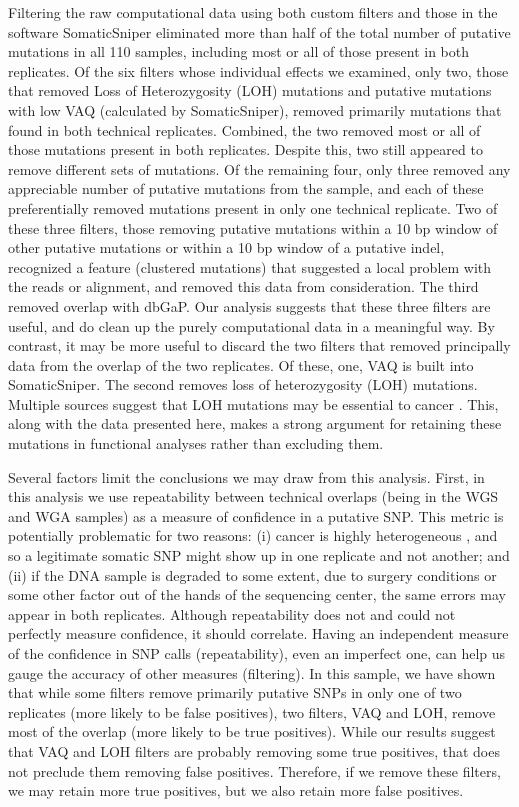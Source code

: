 \documentclass[11pt]{article} %
\begin{document}
Filtering the raw computational data using both custom filters and those in the software SomaticSniper eliminated more than half of the total number of putative mutations in all 110 samples, including most or all of those present in both replicates.  Of the six filters whose individual effects we examined, only two, those that removed Loss of Heterozygosity (LOH) mutations and putative mutations with low VAQ (calculated by SomaticSniper), removed primarily mutations that found in both technical replicates. Combined, the two removed most or all of those mutations present in both replicates. Despite this, two still appeared to remove different sets of mutations. Of the remaining four, only three removed any appreciable number of putative mutations from the sample, and each of these preferentially removed mutations present in only one technical replicate. Two of these three filters, those removing putative mutations within a 10 bp window of other putative mutations or within a 10 bp window of a putative indel, recognized a feature (clustered mutations) that suggested a local problem with the reads or alignment, and removed this data from consideration. The third removed overlap with dbGaP.  Our analysis suggests that these three filters are useful, and do clean up the purely computational data in a meaningful way. By contrast, it may be more useful to discard the two filters that removed principally data from the overlap of the two replicates. Of these, one, VAQ is built into SomaticSniper. The second removes loss of heterozygosity (LOH) mutations. Multiple sources suggest that LOH mutations may be essential to cancer \cite{LOH}. This, along with the data presented here, makes a strong argument for retaining these mutations in functional analyses rather than excluding them.

Several factors limit the conclusions we may draw from this analysis. First, in this analysis we use repeatability between technical overlaps (being in the WGS and WGA samples) as a measure of confidence in a putative SNP. This metric is potentially problematic for two reasons: (i) cancer is highly heterogeneous \cite{hetero}, and so a legitimate somatic SNP might show up in one replicate and not another; and (ii) if the DNA sample is degraded to some extent, due to surgery conditions or some other factor out of the hands of the sequencing center, the same errors may appear in both replicates. Although repeatability does not and could not perfectly measure confidence, it should correlate. Having an independent measure of the confidence in SNP calls (repeatability), even an imperfect one, can help us gauge the accuracy of other measures (filtering).  In this sample, we have shown that while some filters remove primarily putative SNPs in only one of two replicates (more likely to be false positives), two filters, VAQ and LOH, remove most of the overlap (more likely to be true positives). While our results suggest that VAQ and LOH filters are probably removing some true positives, that does not preclude them removing false positives. Therefore, if we remove these filters, we may retain more true positives, but we also retain more false positives. 
\end{document}
